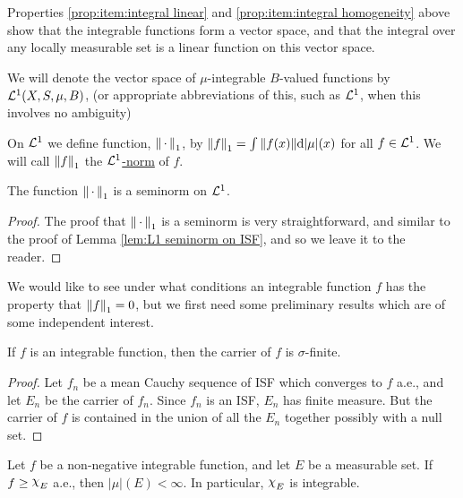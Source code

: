 Properties \ref{prop:item:integral linear} and \ref{prop:item:integral homogeneity} above show that the integrable functions form a vector space, and that the integral over any locally measurable set is a linear function on this vector space.

\begin{definition}
We will denote the vector space of $\mu$-integrable $B$-valued functions by ${\cal L}^1(X,S,\mu,B)$, (or appropriate abbreviations of this, such as ${\cal L}^1$, when this involves no ambiguity)
\end{definition}

\begin{definition}
On ${\cal L}^1$ we define function, $\norm{\,\cdot\,}_1$, by $\norm{f}_1=\int\norm{f(x)}\dd|\mu|(x)$ for all $f\in{\cal L}^1$. We will call $\norm{f}_1$ the \underline{${\cal L}^1$-norm} of $f$.
\end{definition}

\begin{proposition}
The function $\norm{\,\cdot\,}_1$ is a seminorm on ${\cal L}^1$.
\end{proposition}

\begin{proof}
The proof that $\norm{\,\cdot\,}_1$ is a seminorm is very straightforward, and similar to the proof of Lemma \ref{lem:L1 seminorm on ISF}, and so we leave it to the reader.
\end{proof}

We would like to see under what conditions an integrable function $f$ has the property that $\norm{f}_1=0$, but we first need some preliminary results which are of some independent interest.

\begin{proposition}
If $f$ is an integrable function, then the carrier of $f$ is $\sigma$-finite.
\end{proposition}

\begin{proof}
Let $f_n$ be a mean Cauchy sequence of ISF which converges to $f$ a.e., and let $E_n$ be the carrier of $f_n$. Since $f_n$ is an ISF, $E_n$ has finite measure. But the carrier of $f$ is contained in the union of all the $E_n$ together possibly with a null set.
\end{proof}

\begin{proposition}
\label{prop:integrable idf}
Let $f$ be a non-negative integrable function, and let $E$ be a measurable set. If $f\geq\idf{E}$ a.e., then $|\mu|(E)<\infty$. In particular, $\idf{E}$ is integrable.
\end{proposition}

